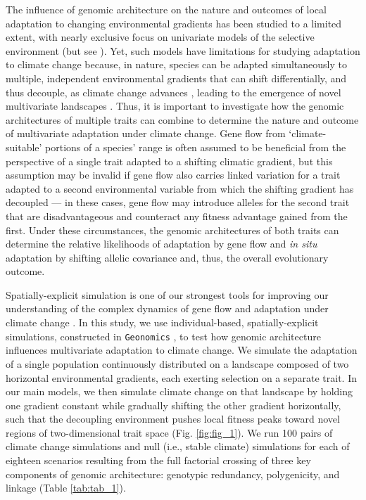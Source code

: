 \documentclass[9pt,twocolumn,twoside,lineno]{new_article}
\begin{document}
The influence of genomic architecture on the nature and outcomes
of local adaptation to changing environmental gradients
has been studied to a limited extent,
with nearly exclusive focus on univariate models
of the selective environment (but see \cite{schiffers}).
Yet, such models have limitations for studying adaptation to climate change
because, in nature, species can be adapted simultaneously to multiple,
independent environmental gradients \cite{guillaume} that can shift differentially,
and thus decouple, as climate change advances
\cite{crimmins,daly},
leading to the emergence of novel multivariate landscapes
\cite{williams_novel_climates,williams_projected_novel_disappearing,fitzpatrick}.
Thus, it is important to investigate how the genomic architectures
of multiple traits can combine to determine the nature and outcome
of multivariate adaptation under climate change.
Gene flow from `climate-suitable' portions of a species' range
is often assumed to be beneficial from the perspective of a single trait
adapted to a shifting climatic gradient, but this assumption
may be invalid if gene flow also carries
linked variation for a trait
adapted to a second environmental variable
from which the shifting gradient has decoupled --- in these cases, gene flow may introduce alleles for the second trait that are disadvantageous and counteract any fitness advantage gained from the first.
Under these circumstances, the genomic architectures of both traits
can determine the relative likelihoods of adaptation by gene flow
and \textit{in situ} adaptation by shifting
allelic covariance
\cite{aitken_whitlock,schiffers} and, thus,
the overall evolutionary outcome.

Spatially-explicit simulation is one of our strongest tools
for improving our understanding of the complex dynamics of gene flow and adaptation
under climate change \cite{capblancq_review}.
In this study, we use individual-based, spatially-explicit simulations,
constructed in \texttt{Geonomics} \cite{terasaki_hart},
to test how genomic architecture influences multivariate adaptation to climate change.
We simulate the adaptation of a single population
continuously distributed on a landscape composed of two horizontal 
environmental gradients, each exerting selection on a separate trait.
In our main models, we then simulate climate change on that landscape by holding one gradient 
constant while gradually shifting the other gradient horizontally, such that
the decoupling environment pushes local fitness peaks toward novel regions 
of two-dimensional trait space (Fig. \ref{fig:fig_1}).
We run 100 pairs of climate change simulations
and null (i.e., stable climate) simulations for each of eighteen scenarios
resulting from the full factorial crossing of three key components
of genomic architecture: genotypic redundancy, polygenicity, and linkage
(Table \ref{tab:tab_1}).
\end{document}
